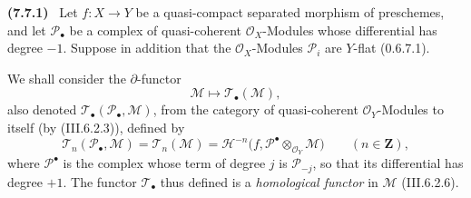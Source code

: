 \documentclass[10pt,oneside]{book}
\newcommand{\sh}[1]{\mathscr{#1}}
\newcommand{\bb}[1]{\mathbf{#1}}
\newcommand{\sref}[2][]{(#2)}
\newcommand{\oldpage}[2][]{\setcounter{footnote}{0}\marginpar{\scriptsize\textbf{#1}~|~#2}\ignorespaces}
\newenvironment{env}[1][]{\par\medskip\noindent\textbf{(#1)}\ }{\par}
\begin{document}
\begin{env}[7.7.1]
\label{III.7.7.1}
Let $f:X\to Y$ be a quasi-compact separated morphism of
preschemes, and let $\sh{P}_\bullet$ be a complex of
quasi-coherent $\sh{O}_X$-Modules whose differential has
degree $-1$.  Suppose in addition that the $\sh{O}_X$-Modules
$\sh{P}_i$ are $Y$-flat \sref[0]{0.6.7.1}.

\oldpage[III]{198}
We shall consider the $\partial$-functor
\[
  \sh{M}\longmapsto\sh{T}_\bullet(\sh{M}),
\]
also denoted
$\sh{T}_\bullet(\sh{P}_\bullet,\sh{M})$, from the category of
quasi-coherent $\sh{O}_Y$-Modules to itself (by
\sref{III.6.2.3}), defined by
\[
  \sh{T}_n(\sh{P}_\bullet,\sh{M})
  =\sh{T}_n(\sh{M})
  =\mathscr{H}^{-n}
    \bigl(f,\sh{P}^\bullet\otimes_{\sh{O}_Y}\sh{M}\bigr)
  \qquad(n\in\bb Z),
  \tag{7.7.1.1}\label{III.7.7.1.1}
\]
where $\sh{P}^\bullet$ is the complex whose term of degree
$j$ is $\sh{P}_{-j}$, so that its differential has degree
$+1$.  The functor $\sh{T}_\bullet$ thus defined is a
\emph{homological functor} in $\sh{M}$ \sref{III.6.2.6}.
\end{env}
\end{document}
